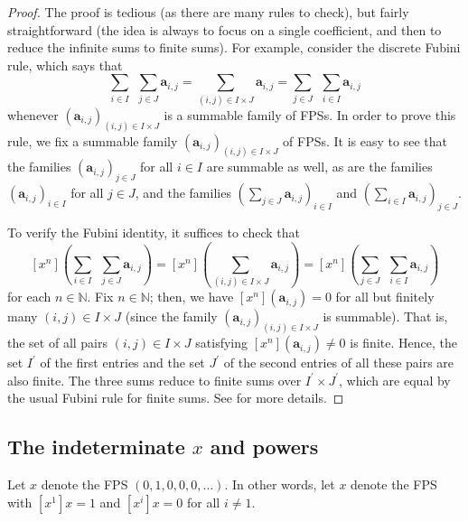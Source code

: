 \begin{proof}
The proof is tedious
(as there are many rules to check), but fairly straightforward (the idea is
always to focus on a single coefficient, and then to reduce the infinite sums
to finite sums). For example, consider the discrete Fubini
rule, which says that
\[
\sum_{i\in I}\ \ \sum_{j\in J}\mathbf{a}_{i,j}=\sum_{\left(i,j\right) \in
I\times J}\mathbf{a}_{i,j}=\sum_{j\in J}\ \ \sum_{i\in I}\mathbf{a}_{i,j}
\]
whenever $\left(\mathbf{a}_{i,j}\right)_{\left(i,j\right) \in I\times
J}$ is a summable family of FPSs. In order to prove this rule, we fix a
summable family $\left(\mathbf{a}_{i,j}\right)_{\left(i,j\right) \in
I\times J}$ of FPSs. It is easy to see that the families $\left(
\mathbf{a}_{i,j}\right)_{j\in J}$ for all $i\in I$ are summable as well, as
are the families $\left(\mathbf{a}_{i,j}\right)_{i\in I}$ for all $j\in
J$, and the families $\left(\sum_{j\in J}\mathbf{a}_{i,j}\right)_{i\in I}$
and $\left(\sum_{i\in I}\mathbf{a}_{i,j}\right)_{j\in J}$.

To verify the Fubini identity, it suffices to check that
\[
\left[x^{n}\right]\left(\sum_{i\in I}\ \ \sum_{j\in J}\mathbf{a}%
_{i,j}\right) = \left[x^{n}\right]\left(\sum_{\left(i,j\right) \in
I\times J}\mathbf{a}_{i,j}\right) = \left[x^{n}\right]\left(\sum_{j\in
J}\ \ \sum_{i\in I}\mathbf{a}_{i,j}\right)
\]
for each $n\in\mathbb{N}$. Fix $n\in\mathbb{N}$; then, we have $\left[
x^{n}\right]\left(\mathbf{a}_{i,j}\right) =0$ for all but finitely many
$\left(i,j\right) \in I\times J$ (since the family $\left(\mathbf{a}%
_{i,j}\right)_{\left(i,j\right) \in I\times J}$ is summable). That is,
the set of all pairs $\left(i,j\right) \in I\times J$ satisfying $\left[
x^{n}\right]\left(\mathbf{a}_{i,j}\right) \neq0$ is finite. Hence, the
set $I^{\prime}$ of the first entries and the set $J^{\prime}$ of the second entries
of all these pairs are also finite. The three sums reduce to finite sums over
$I^{\prime}\times J^{\prime}$, which are equal by the usual Fubini rule for finite sums.
See \cite[proof of Proposition 7.2.11]{19s} for more details.
\end{proof}

\subsection{The indeterminate $x$ and powers}

\begin{definition}
\label{def.fps.x}
\leantarget
\leanok
Let $x$ denote the FPS $\left(0,1,0,0,0,\ldots\right)$.
In other words, let $x$ denote the FPS with $\left[x^{1}\right]x=1$ and
$\left[x^{i}\right]x=0$ for all $i\neq1$.
\end{definition}

